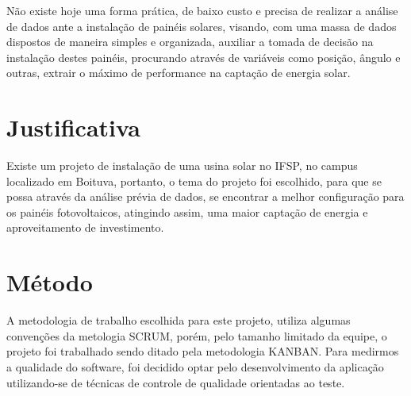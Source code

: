 Não existe hoje uma forma prática, de baixo custo e precisa de realizar a análise de dados ante a instalação de painéis solares, visando, com uma massa de dados dispostos de maneira simples e organizada, auxiliar a tomada de decisão na instalação destes painéis, procurando através de variáveis como posição, ângulo e outras, extrair o máximo de performance na captação de energia solar.

\section{Justificativa}

Existe um projeto de instalação de uma usina solar no IFSP, no campus localizado em Boituva, portanto, o tema do projeto foi escolhido, para que se possa através da análise prévia de dados, se encontrar a melhor configuração para os painéis fotovoltaicos, atingindo assim, uma maior captação de energia e aproveitamento de investimento.

\section{Método}

A metodologia de trabalho escolhida para este projeto, utiliza algumas convenções da metologia SCRUM, porém, pelo tamanho limitado da equipe, o projeto foi trabalhado sendo ditado pela metodologia KANBAN.
Para medirmos a qualidade do software, foi decidido optar pelo desenvolvimento da aplicação utilizando-se de técnicas de controle de qualidade orientadas ao teste.
